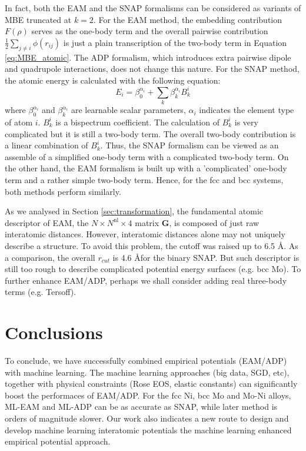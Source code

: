 \documentclass[prb,reprint]{revtex4-2}
\begin{document}
In fact, both the EAM and the SNAP formalisms can be considered as variants of 
MBE truncated at $k=2$. For the EAM method, the embedding contribution $F(\rho)$ 
serves as the one-body term and the overall pairwise contribution 
$\frac{1}{2}\sum_{j\ne i}{\phi(r_{ij})}$ is just a plain transcription of the 
two-body term in Equation \ref{eq:MBE_atomic}. The ADP formalism, which 
introduces extra pairwise dipole and quadrupole interactions, does not change
this nature. For the SNAP method, the atomic energy is calculated with the 
following equation: 
\begin{equation}
\label{eq:snap_formalism}
E_i = \beta_{0}^{\alpha_{i}} + \sum_{k}{\beta_{k}^{\alpha_{i}}B_{k}^i}
\end{equation} 
where $\beta_{0}^{\alpha_i}$ and $\beta_{k}^{\alpha_i}$ are learnable scalar
parameters, $\alpha_i$ indicates the element type of atom $i$. $B_{k}^{i}$ is a 
bispectrum coefficient. The calculation of $B_{k}^{i}$ is very complicated but 
it is still a two-body term. The overall two-body contribution is a linear 
combination of $B_{k}^{i}$. Thus, the SNAP formalism can be viewed as an 
assemble of a simplified one-body term with a complicated two-body term. On the 
other hand, the EAM formalism is built up with a 'complicated' one-body term and 
a rather simple two-body term. Hence, for the fcc and bcc systems, both methods 
perform similarly. 

As we analysed in Section \ref{sec:transformation}, the fundamental atomic 
descriptor of EAM, the $N \times N^{\mathrm{nl}} \times 4$ matrix $\mathbf{G}$, 
is composed of just raw interatomic distances. However, interatomic distances
alone may not uniquely describe a structure. To avoid this problem, the cutoff 
was raised up to 6.5 \AA. As a comparison, the overall $r_{cut}$ is 4.6 \AA for 
the binary SNAP. But such descriptor is still too rough to describe complicated 
potential energy surfaces (e.g. bcc Mo). To further enhance EAM/ADP, perhaps we 
shall consider adding real three-body terms (e.g. Tersoff).

% 
%
\section{Conclusions}
\label{sec:conclusions}

To conclude, we have successfully combined empirical potentials (EAM/ADP) with 
machine learning. The machine learning approaches (big data, SGD, etc), together 
with physical constraints (Rose EOS, elastic constants) can significantly boost
the performaces of EAM/ADP. For the fcc Ni, bcc Mo and Mo-Ni alloys, ML-EAM and
ML-ADP can be as accurate as SNAP, while later method is orders of magnitude 
slower. Our work also indicates a new route to design and develop machine 
learning interatomic potentials \textemdash the machine learning enhanced 
empirical potential approach.
\end{document}
